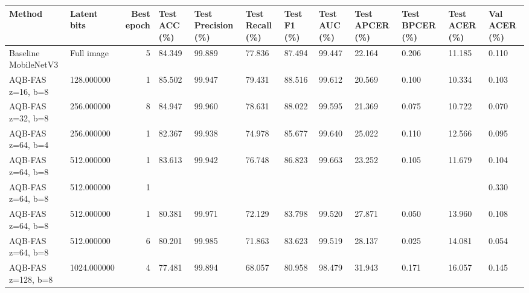 \begin{tabular}{llrlllllllll}
\toprule
Method & Latent bits & Best epoch & Test ACC (\%) & Test Precision (\%) & Test Recall (\%) & Test F1 (\%) & Test AUC (\%) & Test APCER (\%) & Test BPCER (\%) & Test ACER (\%) & Val ACER (\%) \\
\midrule
Baseline MobileNetV3 & Full image & 5 & 84.349 & 99.889 & 77.836 & 87.494 & 99.447 & 22.164 & 0.206 & 11.185 & 0.110 \\
AQB-FAS z=16, b=8 & 128.000000 & 1 & 85.502 & 99.947 & 79.431 & 88.516 & 99.612 & 20.569 & 0.100 & 10.334 & 0.103 \\
AQB-FAS z=32, b=8 & 256.000000 & 8 & 84.947 & 99.960 & 78.631 & 88.022 & 99.595 & 21.369 & 0.075 & 10.722 & 0.070 \\
AQB-FAS z=64, b=4 & 256.000000 & 1 & 82.367 & 99.938 & 74.978 & 85.677 & 99.640 & 25.022 & 0.110 & 12.566 & 0.095 \\
AQB-FAS z=64, b=8 & 512.000000 & 1 & 83.613 & 99.942 & 76.748 & 86.823 & 99.663 & 23.252 & 0.105 & 11.679 & 0.104 \\
AQB-FAS z=64, b=8 & 512.000000 & 1 &  &  &  &  &  &  &  &  & 0.330 \\
AQB-FAS z=64, b=8 & 512.000000 & 1 & 80.381 & 99.971 & 72.129 & 83.798 & 99.520 & 27.871 & 0.050 & 13.960 & 0.108 \\
AQB-FAS z=64, b=8 & 512.000000 & 6 & 80.201 & 99.985 & 71.863 & 83.623 & 99.519 & 28.137 & 0.025 & 14.081 & 0.054 \\
AQB-FAS z=128, b=8 & 1024.000000 & 4 & 77.481 & 99.894 & 68.057 & 80.958 & 98.479 & 31.943 & 0.171 & 16.057 & 0.145 \\
\bottomrule
\end{tabular}
